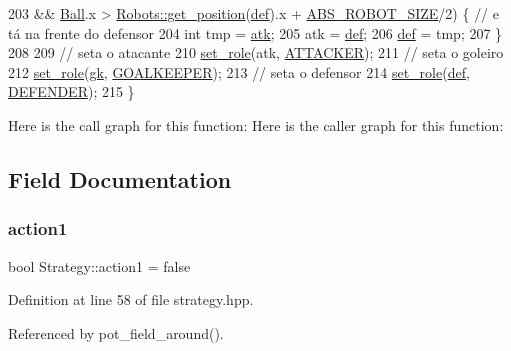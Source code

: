 \begin{DoxyCode}
203              && \hyperlink{class_strategy_abd16b6276e747f6cd99a19963ff5495b}{Ball}.x > \hyperlink{class_robots_a1fca8f2f5070176faa6ba1efa2f1ff14}{Robots::get\_position}(\hyperlink{class_strategy_ade11a007d9479832ddc5e69169e23692}{def}).x + 
      \hyperlink{namespace_c_o_n_s_t_a8d0d7fe4341b9129cabd565ef16a0640}{ABS\_ROBOT\_SIZE}/2) \{ \textcolor{comment}{// e tá na frente do defensor}
204         \textcolor{keywordtype}{int} tmp = \hyperlink{class_strategy_af06cfb5e28b7a30cfaa312c7a1c051b1}{atk};
205         atk = \hyperlink{class_strategy_ade11a007d9479832ddc5e69169e23692}{def};
206         \hyperlink{class_strategy_ade11a007d9479832ddc5e69169e23692}{def} = tmp;
207     \}
208 
209     \textcolor{comment}{// seta o atacante}
210     \hyperlink{class_strategy_ad2a232eda7c95636be17a3d528547b5f}{set\_role}(atk, \hyperlink{strategy_8cpp_aea4f6064a6384f5525777880f0ef167f}{ATTACKER});
211     \textcolor{comment}{// seta o goleiro}
212     \hyperlink{class_strategy_ad2a232eda7c95636be17a3d528547b5f}{set\_role}(\hyperlink{class_strategy_a7efb4f780b78ee593649340a7f948c36}{gk}, \hyperlink{strategy_8cpp_afa71f4eb5f5c11de6039a07252dab1be}{GOALKEEPER});
213     \textcolor{comment}{// seta o defensor}
214     \hyperlink{class_strategy_ad2a232eda7c95636be17a3d528547b5f}{set\_role}(\hyperlink{class_strategy_ade11a007d9479832ddc5e69169e23692}{def}, \hyperlink{strategy_8cpp_a692df89f7ea5a93b2cb96a2d2a8c9c36}{DEFENDER});
215 \}
\end{DoxyCode}
Here is the call graph for this function\+:
Here is the caller graph for this function\+:


\subsection{Field Documentation}
\mbox{\label{class_strategy_a4de1cb2a30b7eb871e68ddefd03f6089}} 
\subsubsection{\texorpdfstring{action1}{action1}}
{\footnotesize\ttfamily bool Strategy\+::action1 = false}



Definition at line 58 of file strategy.\+hpp.



Referenced by pot\+\_\+field\+\_\+around().

